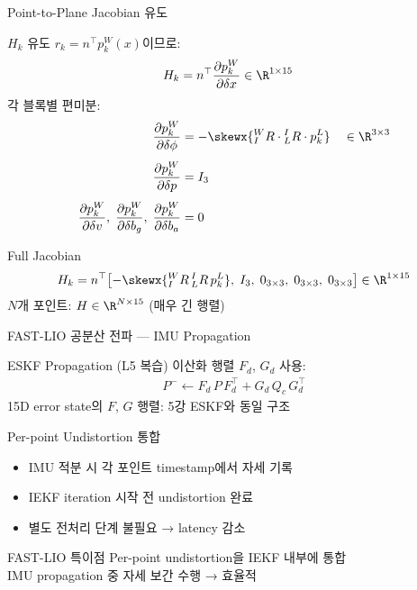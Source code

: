 \begin{frame}[shrink=20]{Point-to-Plane Jacobian 유도}
  \begin{block}{$H_k$ 유도}
    $r_k = n^\top p_k^W(x)$이므로:
    \begin{align*}
      H_k &= n^\top \frac{\partial p_k^W}{\partial \delta x}
           \in \R^{1\times 15}
    \end{align*}
    각 블록별 편미분:
    \begin{align*}
      \frac{\partial p_k^W}{\partial \delta\phi}
        &= -\skewx{{}^W_IR \cdot {}^I_LR \cdot p_k^L}
           \quad \in \R^{3\times3}\\[4pt]
      \frac{\partial p_k^W}{\partial \delta p}
        &= I_3\\[4pt]
      \frac{\partial p_k^W}{\partial \delta v},\;
      \frac{\partial p_k^W}{\partial \delta b_g},\;
      \frac{\partial p_k^W}{\partial \delta b_a}
        &= 0
    \end{align*}
  \end{block}
  \pause
  \begin{block}{Full Jacobian}
    \begin{align*}
      H_k = n^\top\bigl[
        -\skewx{{}^W_IR\,{}^I_LR\,p_k^L},\;
        I_3,\;
        0_{3\times3},\;
        0_{3\times3},\;
        0_{3\times3}
      \bigr] \in \R^{1\times15}
    \end{align*}
    $N$개 포인트: $H \in \R^{N\times15}$ (매우 긴 행렬)
  \end{block}
\end{frame}

\begin{frame}{FAST-LIO 공분산 전파 — IMU Propagation}
  \begin{block}{ESKF Propagation (L5 복습)}
    이산화 행렬 $F_d$, $G_d$ 사용:
    \begin{align*}
      P^- \leftarrow F_d\,P\,F_d^\top + G_d\,Q_c\,G_d^\top
    \end{align*}
    15D error state의 $F$, $G$ 행렬: 5강 ESKF와 동일 구조
  \end{block}
  \pause
  \begin{block}{Per-point Undistortion 통합}
    \begin{itemize}
      \item IMU 적분 시 각 포인트 timestamp에서 자세 기록
      \item IEKF iteration 시작 전 undistortion 완료
      \item 별도 전처리 단계 불필요 → latency 감소
    \end{itemize}
  \end{block}
  \pause
  \begin{alertblock}{FAST-LIO 특이점}
    Per-point undistortion을 IEKF 내부에 통합\\
    IMU propagation 중 자세 보간 수행 → 효율적
  \end{alertblock}
\end{frame}

